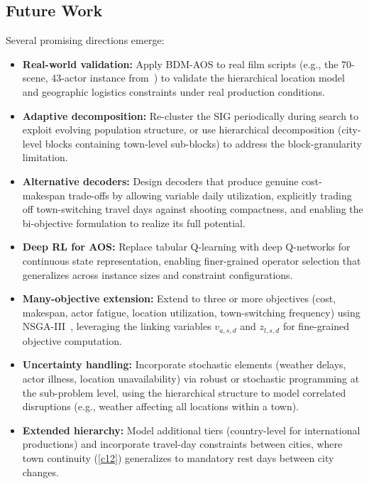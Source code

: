 \subsection{Future Work}

Several promising directions emerge:

\begin{itemize}
    \item \textbf{Real-world validation:} Apply BDM-AOS to real film scripts (e.g., the 70-scene, 43-actor instance from~\citet{tekin2023}) to validate the hierarchical location model and geographic logistics constraints under real production conditions.

    \item \textbf{Adaptive decomposition:} Re-cluster the SIG periodically during search to exploit evolving population structure, or use hierarchical decomposition (city-level blocks containing town-level sub-blocks) to address the block-granularity limitation.

    \item \textbf{Alternative decoders:} Design decoders that produce genuine cost-makespan trade-offs by allowing variable daily utilization, explicitly trading off town-switching travel days against shooting compactness, and enabling the bi-objective formulation to realize its full potential.

    \item \textbf{Deep RL for AOS:} Replace tabular Q-learning with deep Q-networks for continuous state representation, enabling finer-grained operator selection that generalizes across instance sizes and constraint configurations.

    \item \textbf{Many-objective extension:} Extend to three or more objectives (cost, makespan, actor fatigue, location utilization, town-switching frequency) using NSGA-III~\citep{deb2014}, leveraging the linking variables $v_{a,s,d}$ and $z_{l,s,d}$ for fine-grained objective computation.

    \item \textbf{Uncertainty handling:} Incorporate stochastic elements (weather delays, actor illness, location unavailability) via robust or stochastic programming at the sub-problem level, using the hierarchical structure to model correlated disruptions (e.g., weather affecting all locations within a town).

    \item \textbf{Extended hierarchy:} Model additional tiers (country-level for international productions) and incorporate travel-day constraints between cities, where town continuity (\ref{c12}) generalizes to mandatory rest days between city changes.
\end{itemize}
